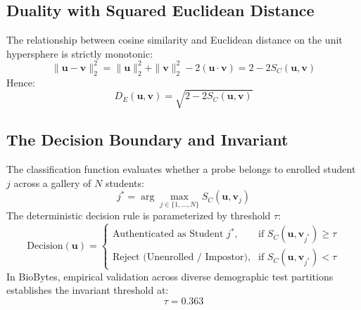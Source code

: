 \documentclass[12pt,a4paper,oneside]{report}
\begin{document}
\subsection{Duality with Squared Euclidean Distance}
The relationship between cosine similarity and Euclidean distance on the unit hypersphere is strictly monotonic:
\begin{equation}
\|\mathbf{u} - \mathbf{v}\|_2^2 = \|\mathbf{u}\|_2^2 + \|\mathbf{v}\|_2^2 - 2(\mathbf{u} \cdot \mathbf{v}) = 2 - 2 S_C(\mathbf{u}, \mathbf{v})
\end{equation}
Hence:
\begin{equation}
D_E(\mathbf{u}, \mathbf{v}) = \sqrt{2 - 2 S_C(\mathbf{u}, \mathbf{v})}
\end{equation}

\subsection{The Decision Boundary and Invariant}
The classification function evaluates whether a probe belongs to enrolled student $j$ across a gallery of $N$ students:
\begin{equation}
j^* = \arg\max_{j \in \{1, \dots, N\}} S_C(\mathbf{u}, \mathbf{v}_j)
\end{equation}
The deterministic decision rule is parameterized by threshold $\tau$:
\begin{equation}
\text{Decision}(\mathbf{u}) = \begin{cases} 
\text{Authenticated as Student } j^*, & \text{if } S_C(\mathbf{u}, \mathbf{v}_{j^*}) \geq \tau \\
\text{Reject (Unenrolled / Impostor)}, & \text{if } S_C(\mathbf{u}, \mathbf{v}_{j^*}) < \tau
\end{cases}
\end{equation}
In BioBytes, empirical validation across diverse demographic test partitions establishes the invariant threshold at:
\begin{equation}
\tau = 0.363
\end{equation}
\end{document}
